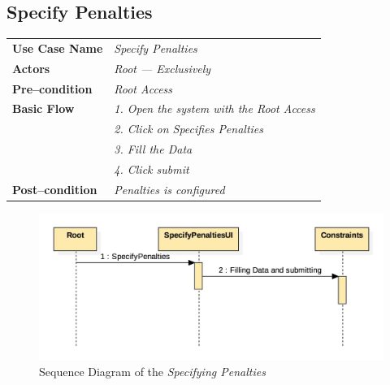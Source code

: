 \documentclass{article}
\begin{document}
\subsection{Specify Penalties}
    \begin{tabular}{ l | l }
    \toprule
      \rowcolor{LightCyan}
      \textbf{Use Case Name}    & \textit{Specify Penalties}\\
      \textbf{Actors}           & \textit{Root --- Exclusively}\\
      \rowcolor{LightCyan}
      \textbf{Pre--condition}   & \textit{Root Access}\\
      \textbf{Basic Flow}       & \textit{1. Open the system with the Root Access}\\
                                & \textit{2. Click on Specifies Penalties}\\
                                & \textit{3. Fill the Data}\\
                                & \textit{4. Click submit}\\
      \rowcolor{LightCyan}
      \textbf{Post--condition}  & \textit{Penalties is configured}\\
    \toprule
    \end{tabular}
\begin{figure}[ht!]
\centering
\includegraphics[width=128mm]{Sequence_SpecifyPenalties}
\caption{Sequence Diagram of the \textit{Specifying Penalties}}
\end{figure}
\end{document}
